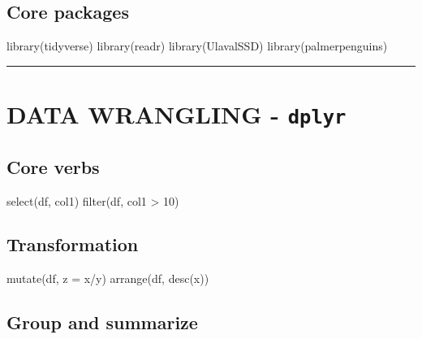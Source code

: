\documentclass[
  english,
  8pt,
  letterpaper,
  DIV=11,
  numbers=noendperiod]{scrartcl}
\newenvironment{Shaded}{\begin{snugshade}}{\end{snugshade}}
\newcommand{\AttributeTok}[1]{\textcolor[rgb]{0.40,0.45,0.13}{#1}}
\newcommand{\DecValTok}[1]{\textcolor[rgb]{0.68,0.00,0.00}{#1}}
\newcommand{\FunctionTok}[1]{\textcolor[rgb]{0.28,0.35,0.67}{#1}}
\newcommand{\NormalTok}[1]{\textcolor[rgb]{0.00,0.23,0.31}{#1}}
\newcommand{\SpecialCharTok}[1]{\textcolor[rgb]{0.37,0.37,0.37}{#1}}
\begin{document}
\subsection{Core packages}\label{core-packages}

\begin{Shaded}
\begin{Highlighting}[]
\FunctionTok{library}\NormalTok{(tidyverse)}
\FunctionTok{library}\NormalTok{(readr)}
\FunctionTok{library}\NormalTok{(UlavalSSD)}
\FunctionTok{library}\NormalTok{(palmerpenguins)}
\end{Highlighting}
\end{Shaded}

\begin{center}\rule{0.5\linewidth}{0.5pt}\end{center}

\section{\texorpdfstring{ DATA WRANGLING -
\texttt{dplyr}}{ DATA WRANGLING - dplyr}}\label{data-wrangling-dplyr}

\subsection{Core verbs}\label{core-verbs}

\begin{Shaded}
\begin{Highlighting}[]
\FunctionTok{select}\NormalTok{(df, col1)}
\FunctionTok{filter}\NormalTok{(df, col1 }\SpecialCharTok{\textgreater{}} \DecValTok{10}\NormalTok{)}
\end{Highlighting}
\end{Shaded}

\subsection{Transformation}\label{transformation}

\begin{Shaded}
\begin{Highlighting}[]
\FunctionTok{mutate}\NormalTok{(df, }\AttributeTok{z =}\NormalTok{ x}\SpecialCharTok{/}\NormalTok{y)}
\FunctionTok{arrange}\NormalTok{(df, }\FunctionTok{desc}\NormalTok{(x))}
\end{Highlighting}
\end{Shaded}

\subsection{Group and summarize}\label{group-and-summarize}
\end{document}
